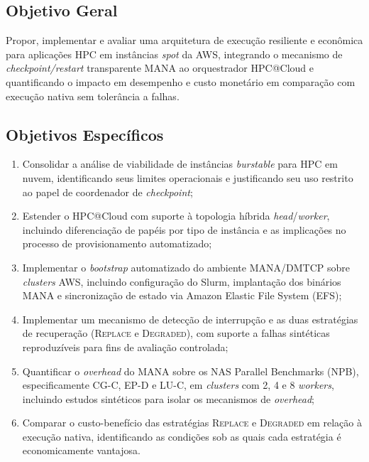 \subsection{Objetivo Geral}
\label{sec:objetivo-geral}

Propor, implementar e avaliar uma arquitetura de execução resiliente e econômica para
aplicações HPC em instâncias \textit{spot} da AWS, integrando o mecanismo de
\textit{checkpoint/restart} transparente MANA ao orquestrador HPC@Cloud e
quantificando o impacto em desempenho e custo monetário em comparação com execução
nativa sem tolerância a falhas.


\subsection{Objetivos Específicos}
\label{sec:objetivos-especificos}

\begin{enumerate}
  \item Consolidar a análise de viabilidade de instâncias \textit{burstable} para HPC
        em nuvem, identificando seus limites operacionais e justificando seu uso
        restrito ao papel de coordenador de \textit{checkpoint};
  \item Estender o HPC@Cloud com suporte à topologia híbrida
        \textit{head}/\textit{worker}, incluindo diferenciação de papéis por tipo de
        instância e as implicações no processo de provisionamento automatizado;
  \item Implementar o \textit{bootstrap} automatizado do ambiente MANA/DMTCP sobre
        \textit{clusters} AWS, incluindo configuração do Slurm, implantação dos binários MANA
        e sincronização de estado via Amazon Elastic File System (EFS);
  \item Implementar um mecanismo de detecção de interrupção e as duas estratégias de
        recuperação (\textsc{Replace} e \textsc{Degraded}), com suporte a falhas
        sintéticas reproduzíveis para fins de avaliação controlada;
  \item Quantificar o \textit{overhead} do MANA sobre os NAS Parallel Benchmarks (NPB),
        especificamente CG-C, EP-D e LU-C, em \textit{clusters} com 2, 4 e 8 \textit{workers}, incluindo
        estudos sintéticos para isolar os mecanismos de \textit{overhead};
  \item Comparar o custo-benefício das estratégias \textsc{Replace} e \textsc{Degraded}
        em relação à execução nativa, identificando as condições sob as quais cada
        estratégia é economicamente vantajosa.
\end{enumerate}


